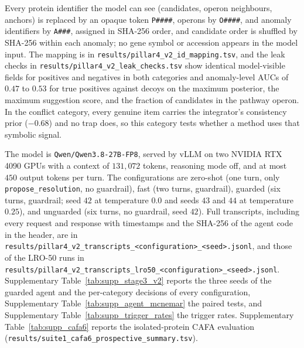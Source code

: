 \documentclass[10pt]{article}
\newcommand{\fn}[1]{\nolinkurl{#1}}
\begin{document}
Every protein identifier the model can see (candidates, operon neighbours, anchors) is replaced by an opaque token \texttt{P\#\#\#\#}, operons by \texttt{O\#\#\#\#}, and anomaly identifiers by \texttt{A\#\#\#}, assigned in SHA-256 order, and candidate order is shuffled by SHA-256 within each anomaly; no gene symbol or accession appears in the model input. The mapping is in \fn{results/pillar4_v2_id_mapping.tsv}, and the leak checks in \fn{results/pillar4_v2_leak_checks.tsv} show identical model-visible fields for positives and negatives in both categories and anomaly-level AUCs of $0.47$ to $0.53$ for true positives against decoys on the maximum posterior, the maximum suggestion score, and the fraction of candidates in the pathway operon. In the conflict category, every genuine item carries the integrator's consistency prior ($-0.68$) and no trap does, so this category tests whether a method uses that symbolic signal.

The model is \fn{Qwen/Qwen3.8-27B-FP8}, served by vLLM on two NVIDIA RTX 4090 GPUs with a context of $131{,}072$ tokens, reasoning mode off, and at most $450$ output tokens per turn. The configurations are zero-shot (one turn, only \fn{propose_resolution}, no guardrail), fast (two turns, guardrail), guarded (six turns, guardrail; seed $42$ at temperature $0.0$ and seeds $43$ and $44$ at temperature $0.25$), and unguarded (six turns, no guardrail, seed $42$). Full transcripts, including every request and response with timestamps and the SHA-256 of the agent code in the header, are in \texttt{results/pillar4\_v2\_transcripts\_<configuration>\_<seed>.jsonl}, and those of the LRO-50 runs in \texttt{results/pillar4\_v2\_transcripts\_lro50\_<configuration>\_<seed>.jsonl}. Supplementary Table~\ref{tab:supp_stage3_v2} reports the three seeds of the guarded agent and the per-category decisions of every configuration, Supplementary Table~\ref{tab:supp_agent_mcnemar} the paired tests, and Supplementary Table~\ref{tab:supp_trigger_rates} the trigger rates. Supplementary Table~\ref{tab:supp_cafa6} reports the isolated-protein CAFA evaluation (\fn{results/suite1_cafa6_prospective_summary.tsv}).


\end{document}
